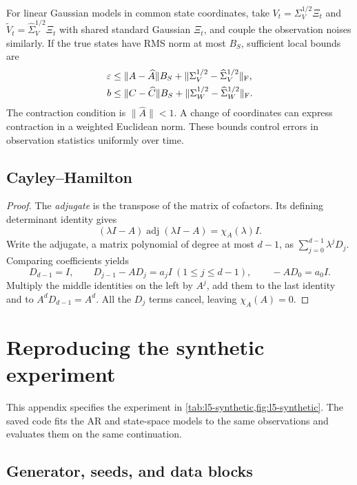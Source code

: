 \documentclass[11pt,twoside]{article}
\theoremstyle{definition}
\theoremstyle{remark}
\begin{document}
For linear Gaussian models in common state coordinates, take
\(V_t=\Sigma_V^{1/2}\Xi_t\) and
\(\widetilde V_t=\widehat\Sigma_V^{1/2}\Xi_t\) with shared standard
Gaussian \(\Xi_t\), and couple the observation noises similarly.
If the true states have RMS norm at most \(B_S\), sufficient local bounds are
\begin{align*}
 \varepsilon&\le\lVert A-\widehat A\rVert B_S+
 \lVert\Sigma_V^{1/2}-\widehat\Sigma_V^{1/2}\rVert_{\rm F},\\
 b&\le\lVert C-\widehat C\rVert B_S+
 \lVert\Sigma_W^{1/2}-\widehat\Sigma_W^{1/2}\rVert_{\rm F}.
\end{align*}
The contraction condition is \(\lVert\widehat A\rVert<1\).
A change of coordinates can express contraction in a weighted
Euclidean norm. These bounds control errors in observation statistics
uniformly over time.

\subsection{Cayley--Hamilton}
\label{app:cayley-hamilton}

\cayleyhamilton*
\begin{proof}
The \emph{adjugate} is the transpose of the matrix of cofactors.
Its defining determinant identity gives
\[
 (\lambda I-A)\operatorname{adj}(\lambda I-A)=\chi_A(\lambda)I.
\]
Write the adjugate, a matrix polynomial of degree at most \(d-1\), as
\(\sum_{j=0}^{d-1}\lambda^jD_j\).
Comparing coefficients yields
\[
 D_{d-1}=I,\qquad
 D_{j-1}-AD_j=a_jI\ (1\le j\le d-1),\qquad
 -AD_0=a_0I.
\]
Multiply the middle identities on the left by \(A^j\), add them
to the last identity and to \(A^dD_{d-1}=A^d\).
All the \(D_j\) terms cancel, leaving \(\chi_A(A)=0\).
\end{proof}

\section{Reproducing the synthetic experiment}
\label{app:synthetic-experiment}

This appendix specifies the experiment in \cref{tab:l5-synthetic,fig:l5-synthetic}.
The saved code fits the AR and state-space models to the same observations
and evaluates them on the same continuation.

\subsection{Generator, seeds, and data blocks}
\end{document}

